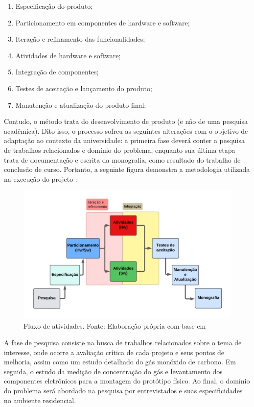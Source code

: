 \begin{enumerate}
    \item Especificação do produto;
    \item Particionamento em componentes de hardware e software;
    \item Iteração e refinamento das funcionalidades;
    \item Atividades de hardware e software;
    \item Integração de componentes;
    \item Testes de aceitação e lançamento do produto;
    \item Manutenção e atualização do produto final;
\end{enumerate}

Contudo, o método trata do desenvolvimento de produto (e não de uma pesquisa acadêmica). Dito isso, o processo sofreu as seguintes alterações com o objetivo de adaptação ao contexto da universidade: a primeira fase deverá conter a pesquisa de trabalhos relacionados e domínio do problema, enquanto sua última etapa trata de documentação e escrita da monografia, como resultado do trabalho de conclusão de curso. Portanto, a seguinte figura demonstra a metodologia utilizada na execução do projeto : 


\begin{figure}[ht]
\centering
\includegraphics[width=.75\textwidth]{img/diagrama-metodologia.png}
\caption{Fluxo de atividades. Fonte: Elaboração própria com base  em \cite{system-design-IOT}}
\label{figMetodologia}
\end{figure}

A fase de pesquisa consiste na busca de trabalhos relacionados sobre o tema de interesse, onde ocorre a avaliação crítica de cada projeto e seus pontos de melhoria, assim como um estudo detalhado do gás monóxido de carbono. Em seguida, o estudo da medição de concentração do gás e levantamento dos componentes eletrônicos para a montagem do protótipo físico. Ao final, o domínio do problema será abordado na pesquisa por entrevistados e suas especificidades no ambiente residencial. 

